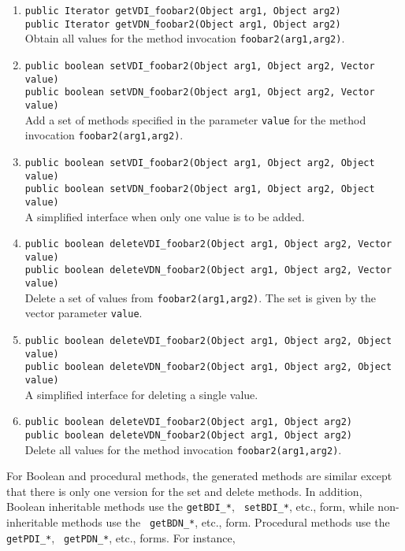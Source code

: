 \begin{enumerate}
\item {\tt public Iterator getVDI\_foobar2(Object arg1, Object arg2)}\\
  {\tt public Iterator getVDN\_foobar2(Object arg1, Object arg2)}
  \\
  Obtain all values for the \fl method invocation {\tt foobar2(arg1,arg2)}.
\item {\tt public boolean setVDI\_foobar2(Object arg1, Object arg2, Vector value)}\\
  {\tt public boolean setVDN\_foobar2(Object arg1, Object arg2, Vector value)}
  \\
  Add a set of methods specified in the parameter {\tt value} for the method
  invocation {\tt foobar2(arg1,arg2)}. 
\item {\tt public boolean setVDI\_foobar2(Object arg1, Object arg2, Object value)}\\
  {\tt public boolean setVDN\_foobar2(Object arg1, Object arg2, Object value)}
  \\
  A simplified interface when only one value is to be added.
\item {\tt public boolean deleteVDI\_foobar2(Object arg1, Object arg2, Vector value)}\\
  {\tt public boolean deleteVDN\_foobar2(Object arg1, Object arg2, Vector value)}
  \\
  Delete a set of values from {\tt foobar2(arg1,arg2)}. The set is given by
  the vector parameter {\tt value}. 
\item {\tt public boolean deleteVDI\_foobar2(Object arg1, Object arg2, Object value)}\\
  {\tt public boolean deleteVDN\_foobar2(Object arg1, Object arg2, Object value)}
  \\
  A simplified interface for deleting a single value.
\item {\tt public boolean deleteVDI\_foobar2(Object arg1, Object arg2)}\\
  {\tt public boolean deleteVDN\_foobar2(Object arg1, Object arg2)}
  \\
  Delete all values for the method invocation {\tt foobar2(arg1,arg2)}. 
\end{enumerate}
For Boolean and procedural methods, the generated methods are similar
except that there is only one version for the set and delete methods. In
addition, Boolean inheritable methods use the {\tt getBDI\_*}, {\tt
  setBDI\_*}, etc., form, while non-inheritable methods use the {\tt
  getBDN\_*}, etc., form.  Procedural methods use the {\tt getPDI\_*}, {\tt
  getPDN\_*}, etc., forms.  For instance,
